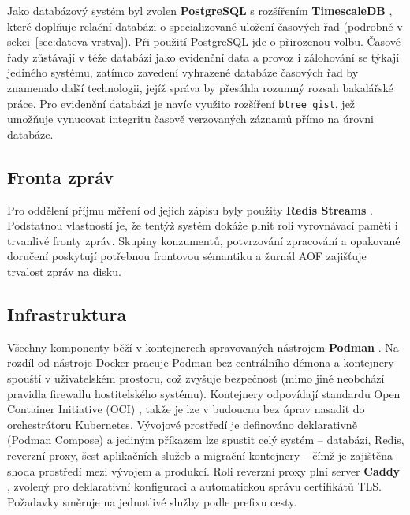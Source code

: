 Jako databázový systém byl zvolen \textbf{PostgreSQL} \parencite{groupPostgreSQL2026} s rozšířením \textbf{TimescaleDB} \parencite{TimeSeriesPostgreSQLPetabyte}, které doplňuje relační databázi o specializované uložení časových řad (podrobně v sekci~\ref{sec:datova-vrstva}). Při použití PostgreSQL jde o přirozenou volbu. Časové řady zůstávají v téže databázi jako evidenční data a provoz i zálohování se týkají jediného systému, zatímco zavedení vyhrazené databáze časových řad by znamenalo další technologii, jejíž správa by přesáhla rozumný rozsah bakalářské práce. Pro evidenční databázi je navíc využito rozšíření \texttt{btree\_gist}, jež umožňuje vynucovat integritu časově verzovaných záznamů přímo na úrovni databáze.

\subsection{Fronta zpráv}

Pro oddělení příjmu měření od jejich zápisu byly použity \textbf{Redis Streams} \parencite{redisRedisRealtimeData}. Podstatnou vlastností je, že tentýž systém dokáže plnit roli vyrovnávací paměti i trvanlivé fronty zpráv. Skupiny konzumentů, potvrzování zpracování a opakované doručení poskytují potřebnou frontovou sémantiku a žurnál AOF zajišťuje trvalost zpráv na disku.

\subsection{Infrastruktura}

Všechny komponenty běží v kontejnerech spravovaných nástrojem \textbf{Podman} \parencite{Podman}. Na rozdíl od nástroje Docker pracuje Podman bez centrálního démona a kontejnery spouští v uživatelském prostoru, což zvyšuje bezpečnost (mimo jiné neobchází pravidla firewallu hostitelského systému). Kontejnery odpovídají standardu Open Container Initiative (OCI) \parencite{OpenContainerInitiative}, takže je lze v budoucnu bez úprav nasadit do orchestrátoru Kubernetes. Vývojové prostředí je definováno deklarativně (Podman Compose) a jediným příkazem lze spustit celý systém -- databázi, Redis, reverzní proxy, šest aplikačních služeb a migrační kontejnery -- čímž je zajištěna shoda prostředí mezi vývojem a produkcí. Roli reverzní proxy plní server \textbf{Caddy} \parencite{serverCaddyUltimateServer}, zvolený pro deklarativní konfiguraci a automatickou správu certifikátů TLS. Požadavky směruje na jednotlivé služby podle prefixu cesty.

